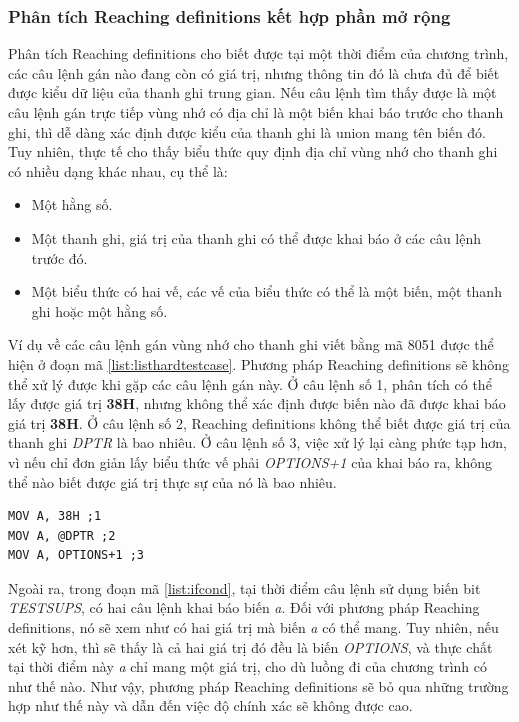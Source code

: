 \subsubsection{Phân tích Reaching definitions kết hợp phần mở rộng}
Phân tích Reaching definitions cho biết được tại một thời điểm của chương trình, các câu lệnh gán nào đang còn có giá trị, nhưng thông tin đó là chưa đủ để biết được kiểu dữ liệu của thanh ghi trung gian. Nếu câu lệnh tìm thấy được là một câu lệnh gán trực tiếp vùng nhớ có địa chỉ là một biến khai báo trước cho thanh ghi, thì dễ dàng xác định được kiểu của thanh ghi là union mang tên biến đó. Tuy nhiên, thực tế cho thấy biểu thức quy định địa chỉ vùng nhớ cho thanh ghi có nhiều dạng khác nhau, cụ thể là:
\begin{itemize}
		\item Một hằng số.
	\item Một thanh ghi, giá trị của thanh ghi có thể được khai báo ở các câu lệnh trước đó.
	\item Một biểu thức có hai vế, các vế của biểu thức có thể là một biến, một thanh ghi hoặc một hằng số.
\end{itemize}
Ví dụ về các câu lệnh gán vùng nhớ cho thanh ghi viết bằng mã 8051 được thể hiện ở đoạn mã \ref{list:listhardtestcase}. Phương pháp Reaching definitions sẽ không thể xử lý được khi gặp các câu lệnh gán này. Ở câu lệnh số 1, phân tích có thể lấy được giá trị \textbf{38H}, nhưng không thể xác định được biến nào đã được khai báo giá trị \textbf{38H}. Ở câu lệnh số 2, Reaching definitions không thể biết được giá trị của thanh ghi \textit{DPTR} là bao nhiêu. Ở câu lệnh số 3, việc xử lý lại càng phức tạp hơn, vì nếu chỉ đơn giản lấy biểu thức vế phải \textit{OPTIONS+1} của khai báo ra, không thể nào biết được giá trị thực sự của nó là bao nhiêu. \\
\begin{lstlisting}[caption={Một số câu lệnh gán trên 8051 mà Reaching definitions không xử lý được},label={list:listhardcase}]
MOV A, 38H ;1
MOV A, @DPTR ;2
MOV A, OPTIONS+1 ;3
\end{lstlisting}
Ngoài ra, trong đoạn mã \ref{list:ifcond}, tại thời điểm câu lệnh sử dụng biến bit \textit{TESTSUPS}, có hai câu lệnh khai báo biến \textit{a}. Đối với phương pháp Reaching definitions, nó sẽ xem như có hai giá trị mà biến \textit{a} có thể mang. Tuy nhiên, nếu xét kỹ hơn, thì sẽ thấy là cả hai giá trị đó đều là biến \textit{OPTIONS}, và thực chất tại thời điểm này \textit{a} chỉ mang một giá trị, cho dù luồng đi của chương trình có như thế nào. Như vậy, phương pháp Reaching definitions sẽ bỏ qua những trường hợp như thế này và dẫn đến việc độ chính xác sẽ không được cao.

